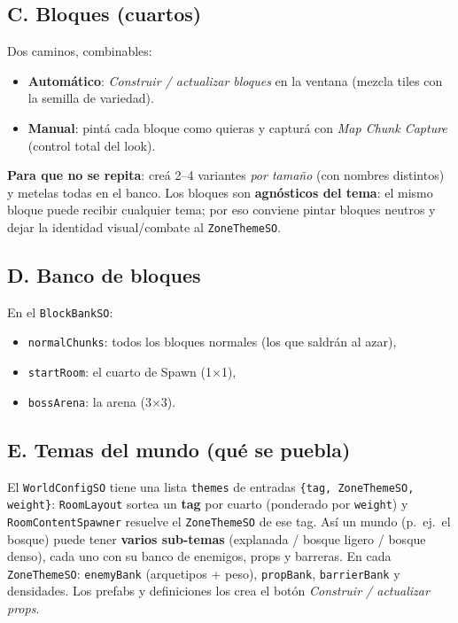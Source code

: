 \documentclass[11pt,a4paper]{article}
\newcommand{\code}[1]{\texttt{#1}}
\begin{document}
\subsection*{C. Bloques (cuartos)}
Dos caminos, combinables:
\begin{itemize}[leftmargin=1.4em]
  \item \textbf{Automático}: \emph{Construir / actualizar bloques} en la ventana (mezcla tiles con la semilla de variedad).
  \item \textbf{Manual}: pintá cada bloque como quieras y capturá con \emph{Map Chunk Capture} (control total del look).
\end{itemize}
\textbf{Para que no se repita}: creá 2--4 variantes \emph{por tamaño} (con nombres distintos) y metelas todas en el banco.
Los bloques son \textbf{agnósticos del tema}: el mismo bloque puede recibir cualquier tema; por eso conviene
pintar bloques neutros y dejar la identidad visual/combate al \code{ZoneThemeSO}.

\subsection*{D. Banco de bloques}
En el \code{BlockBankSO}:
\begin{itemize}[leftmargin=1.4em]
  \item \code{normalChunks}: todos los bloques normales (los que saldrán al azar),
  \item \code{startRoom}: el cuarto de Spawn (1$\times$1),
  \item \code{bossArena}: la arena (3$\times$3).
\end{itemize}

\subsection*{E. Temas del mundo (qué se puebla)}
El \code{WorldConfigSO} tiene una lista \code{themes} de entradas \code{\{tag, ZoneThemeSO, weight\}}:
\code{RoomLayout} sortea un \textbf{tag} por cuarto (ponderado por \code{weight}) y \code{RoomContentSpawner}
resuelve el \code{ZoneThemeSO} de ese tag. Así un mundo (p.\ ej.\ el bosque) puede tener \textbf{varios
sub-temas} (explanada / bosque ligero / bosque denso), cada uno con su banco de enemigos, props y barreras.
En cada \code{ZoneThemeSO}: \code{enemyBank} (arquetipos + peso), \code{propBank}, \code{barrierBank} y densidades.
Los prefabs y definiciones los crea el botón \emph{Construir / actualizar props}.
\end{document}
